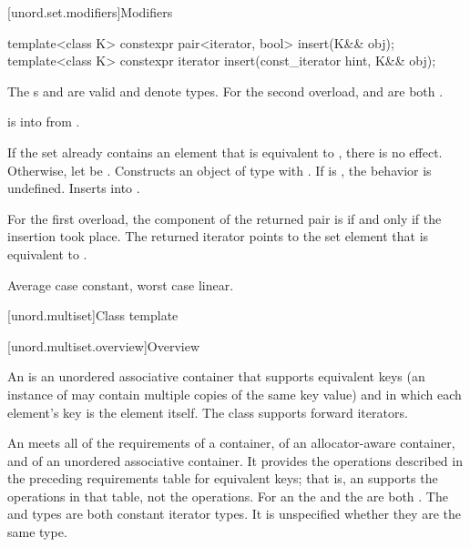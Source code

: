 [unord.set.modifiers]{Modifiers}

%
\begin{itemdecl}
template<class K> constexpr pair<iterator, bool> insert(K&& obj);
template<class K> constexpr iterator insert(const_iterator hint, K&& obj);
\end{itemdecl}

\begin{itemdescr}
\pnum
\constraints
The s  and
 are valid and denote types.
For the second overload,
 and
 are both .

\pnum
\expects
{} is 
into  from .

\pnum
\effects
If the set already contains an element that is equivalent to ,
there is no effect.
Otherwise, let  be .
Constructs an object  of type 
with .
If  is ,
the behavior is undefined.
Inserts  into .

\pnum
\returns
For the first overload,
the  component of the returned pair is 
if and only if the insertion took place.
The returned iterator points to the set element
that is equivalent to .

\pnum
\complexity
Average case constant, worst case linear.
\end{itemdescr}

[unord.multiset]{Class template }%

[unord.multiset.overview]{Overview}

\pnum
{}%
%
An  is an unordered associative container
that supports equivalent keys (an instance of  may contain
multiple copies of the same key value) and in which each element's key
is the element itself.
The  class
supports forward iterators.

\pnum
An  meets all of the requirements
of a container,
of an allocator-aware container, and
of an unordered associative container.
It provides the operations described in the
preceding requirements table for equivalent keys; that is, an 
supports the  operations in that table, not the  operations.
For an  the  and the  are
both . The  and  types are both
constant iterator types. It is unspecified whether they are the same type.


